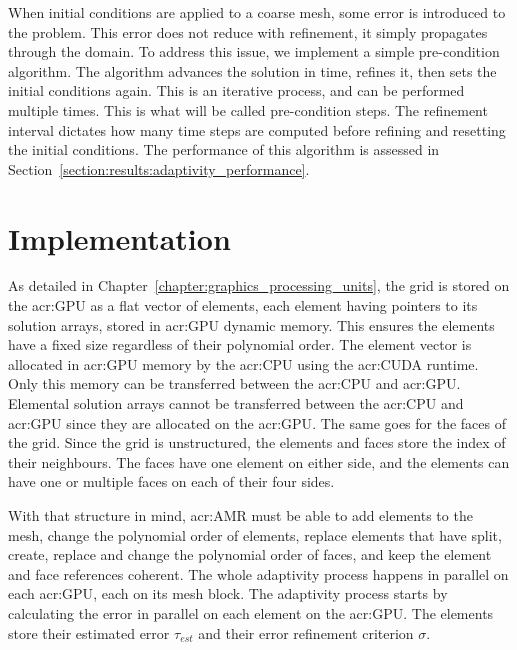 When initial conditions are applied to a coarse mesh, some error is introduced to the problem. This
error does not reduce with refinement, it simply propagates through the domain. To address this
issue, we implement a simple pre-condition algorithm. The algorithm advances the solution in time,
refines it, then sets the initial conditions again. This is an iterative process, and can be
performed multiple times. This is what will be called pre-condition steps. The refinement interval
dictates how many time steps are computed before refining and resetting the initial conditions. The
performance of this algorithm is assessed in Section~\ref{section:results:adaptivity_performance}.

\section{Implementation}\label{section:adaptive_mesh_refinement:implementation}

As detailed in Chapter~\ref{chapter:graphics_processing_units}, the grid is stored on the
\acrshort{acr:GPU} as a flat vector of elements, each element having pointers to its solution
arrays, stored in \acrshort{acr:GPU} dynamic memory. This ensures the elements have a fixed size
regardless of their polynomial order. The element vector is allocated in \acrshort{acr:GPU} memory
by the \acrshort{acr:CPU} using the \acrshort{acr:CUDA} runtime. Only this memory can be transferred
between the \acrshort{acr:CPU} and \acrshort{acr:GPU}. Elemental solution arrays cannot be
transferred between the \acrshort{acr:CPU} and \acrshort{acr:GPU} since they are allocated on the
\acrshort{acr:GPU}. The same goes for the faces of the grid. Since the grid is unstructured, the
elements and faces store the index of their neighbours. The faces have one element on either side,
and the elements can have one or multiple faces on each of their four sides.

With that structure in mind, \acrlong{acr:AMR} must be able to add elements to the mesh, change the
polynomial order of elements, replace elements that have split, create, replace and change the
polynomial order of faces, and keep the element and face references coherent. The whole adaptivity
process happens in parallel on each \acrshort{acr:GPU}, each on its mesh block. The adaptivity
process starts by calculating the error in parallel on each element on the \acrshort{acr:GPU}. The
elements store their estimated error \(\tau_{est}\) and their error refinement criterion \(\sigma
\).

